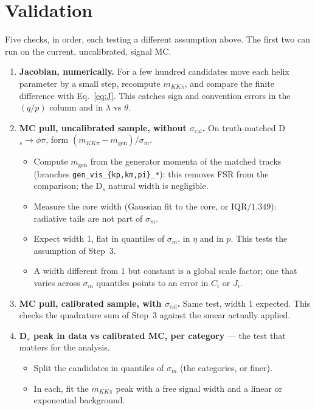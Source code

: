 \documentclass[11pt,a4paper]{article}
\newcommand{\qp}{(q/p)}
\newcommand{\br}[1]{\texttt{#1}}
\newcommand{\scal}{\sigma_{\mathrm{cal}}}
\newcommand{\mKKpi}{m_{KK\pi}}
\begin{document}
\section{Validation}
\label{sec:val}

Five checks, in order, each testing a different assumption above. The first two can run on the current,
uncalibrated, signal MC.

\begin{enumerate}[label=\textbf{\arabic*.}]
  \item \textbf{Jacobian, numerically.} For a few hundred candidates move each helix parameter by a small step,
        recompute $\mKKpi$, and compare the finite difference with Eq.~\eqref{eq:J}. This catches sign and
        convention errors in the $\qp$ column and in $\lambda$ vs $\theta$.
  \item \textbf{MC pull, uncalibrated sample, without $\scal$.} On truth-matched D$_s\to\phi\pi$, form
        $(\mKKpi - m_{\mathrm{gen}})/\sigma_m$.
        \begin{itemize}
          \item Compute $m_{\mathrm{gen}}$ from the generator momenta of the matched tracks
                (branches \br{gen\_vis\_\{kp,km,pi\}\_*}): this removes FSR from the comparison; the D$_s$ natural width is
                negligible.
          \item Measure the core width (Gaussian fit to the core, or IQR$/1.349$): radiative tails are not part
                of $\sigma_m$.
          \item Expect width 1, flat in quantiles of $\sigma_m$, in $\eta$ and in $p$. This tests the assumption
                of Step~3.
          \item A width different from 1 but constant is a global scale factor; one that varies across
                $\sigma_m$ quantiles points to an error in $C_i$ or $J_i$.
        \end{itemize}
  \item \textbf{MC pull, calibrated sample, with $\scal$.} Same test, width 1 expected. This checks the
        quadrature sum of Step~3 against the smear actually applied.
  \item \textbf{D$_s$ peak in data vs calibrated MC, per category} --- the test that matters for the analysis.
        \begin{itemize}
          \item Split the candidates in quantiles of $\sigma_m$ (the categories, or finer).
          \item In each, fit the $\mKKpi$ peak with a free signal width and a linear or exponential background.

\end{itemize}
\end{enumerate}
\end{document}
